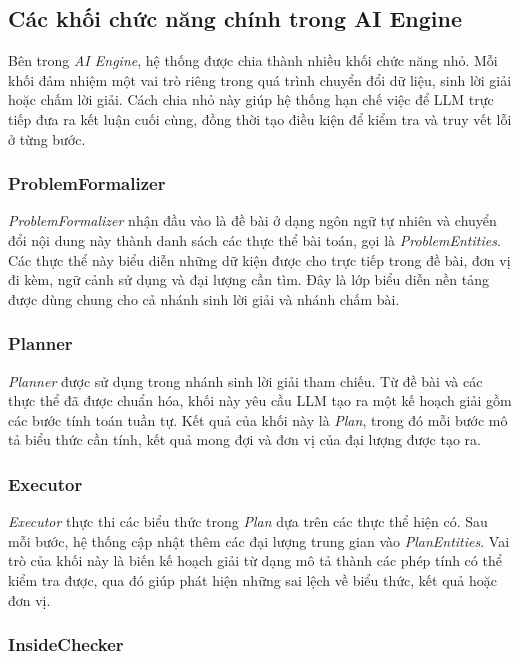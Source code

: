 \documentclass[12pt,a4paper]{article}
\begin{document}
\subsection{Các khối chức năng chính trong AI Engine}

Bên trong \textit{AI Engine}, hệ thống được chia thành nhiều khối chức năng nhỏ. Mỗi khối đảm nhiệm một vai trò riêng trong quá trình chuyển đổi dữ liệu, sinh lời giải hoặc chấm lời giải. Cách chia nhỏ này giúp hệ thống hạn chế việc để LLM trực tiếp đưa ra kết luận cuối cùng, đồng thời tạo điều kiện để kiểm tra và truy vết lỗi ở từng bước.

\subsubsection{ProblemFormalizer}

\textit{ProblemFormalizer} nhận đầu vào là đề bài ở dạng ngôn ngữ tự nhiên và chuyển đổi nội dung này thành danh sách các thực thể bài toán, gọi là \textit{ProblemEntities}. Các thực thể này biểu diễn những dữ kiện được cho trực tiếp trong đề bài, đơn vị đi kèm, ngữ cảnh sử dụng và đại lượng cần tìm. Đây là lớp biểu diễn nền tảng được dùng chung cho cả nhánh sinh lời giải và nhánh chấm bài.

\subsubsection{Planner}

\textit{Planner} được sử dụng trong nhánh sinh lời giải tham chiếu. Từ đề bài và các thực thể đã được chuẩn hóa, khối này yêu cầu LLM tạo ra một kế hoạch giải gồm các bước tính toán tuần tự. Kết quả của khối này là \textit{Plan}, trong đó mỗi bước mô tả biểu thức cần tính, kết quả mong đợi và đơn vị của đại lượng được tạo ra.

\subsubsection{Executor}

\textit{Executor} thực thi các biểu thức trong \textit{Plan} dựa trên các thực thể hiện có. Sau mỗi bước, hệ thống cập nhật thêm các đại lượng trung gian vào \textit{PlanEntities}. Vai trò của khối này là biến kế hoạch giải từ dạng mô tả thành các phép tính có thể kiểm tra được, qua đó giúp phát hiện những sai lệch về biểu thức, kết quả hoặc đơn vị.

\subsubsection{InsideChecker}
\end{document}

